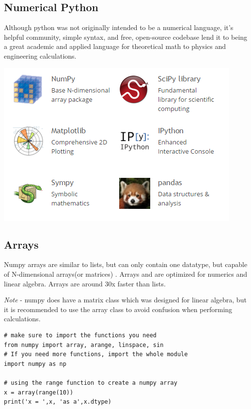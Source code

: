 \documentclass[%
oneside,                 %
final,                   %
10pt]{article}
\begin{document}
\subsection{Numerical Python}

Although python was not originally intended to be a numerical language, it's helpful community, simple syntax, and free, open-source codebase lend it to being a great academic and applied language for theoretical math to physics and engineering calculations.



\centerline{\includegraphics[width=0.75\linewidth]{fig/scipy.png}}



\subsection{Arrays}
\label{sec:arrays}

Numpy arrays are similar to lists, but can only contain one datatype, but capable of N-dimensional arrays(or matrices) . Arrays and are optimized for numerics and linear algebra. Arrays are around 30x faster than lists.

\emph{Note} - numpy does have a matrix class which was designed for linear algebra, but it is recommended to use the array class to avoid confusion when performing calculations.

\begin{verbatim}
# make sure to import the functions you need
from numpy import array, arange, linspace, sin
# If you need more functions, import the whole module
import numpy as np

# using the range function to create a numpy array
x = array(range(10))
print('x = ',x, 'as a',x.dtype)
\end{verbatim}
\end{document}
